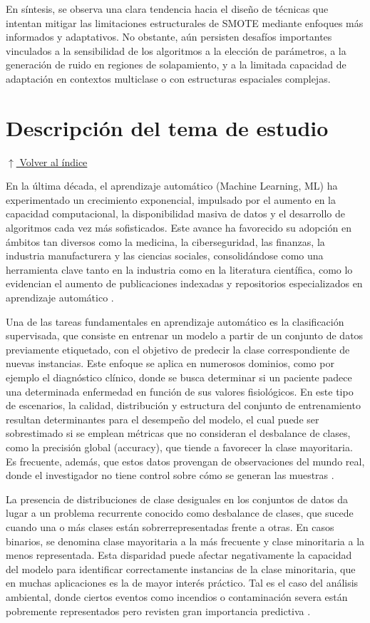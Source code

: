 \documentclass[12pt,a4paper]{article}
\begin{document}
En síntesis, se observa una clara tendencia hacia el diseño de técnicas que intentan mitigar las limitaciones estructurales de SMOTE mediante enfoques más informados y adaptativos. No obstante, aún persisten desafíos importantes vinculados a la sensibilidad de los algoritmos a la elección de parámetros, a la generación de ruido en regiones de solapamiento, y a la limitada capacidad de adaptación en contextos multiclase o con estructuras espaciales complejas.


\section{Descripción del tema de estudio} 
\noindent\hyperlink{toc}{\small$\uparrow$ Volver al índice}

En la última década, el aprendizaje automático (Machine Learning, ML) ha experimentado un crecimiento exponencial, impulsado por el aumento en la capacidad computacional, la disponibilidad masiva de datos y el desarrollo de algoritmos cada vez más sofisticados. Este avance ha favorecido su adopción en ámbitos tan diversos como la medicina, la ciberseguridad, las finanzas, la industria manufacturera y las ciencias sociales, consolidándose como una herramienta clave tanto en la industria como en la literatura científica, como lo evidencian el aumento de publicaciones indexadas y repositorios especializados en aprendizaje automático \parencite{khorshidi2025synthetic, nasaruddin2025smote}.

Una de las tareas fundamentales en aprendizaje automático es la clasificación supervisada, que consiste en entrenar un modelo a partir de un conjunto de datos previamente etiquetado, con el objetivo de predecir la clase correspondiente de nuevas instancias. Este enfoque se aplica en numerosos dominios, como por ejemplo el diagnóstico clínico, donde se busca determinar si un paciente padece una determinada enfermedad en función de sus valores fisiológicos. En este tipo de escenarios, la calidad, distribución y estructura del conjunto de entrenamiento resultan determinantes para el desempeño del modelo, el cual puede ser sobrestimado si se emplean métricas que no consideran el desbalance de clases, como la precisión global (accuracy), que tiende a favorecer la clase mayoritaria. Es frecuente, además, que estos datos provengan de observaciones del mundo real, donde el investigador no tiene control sobre cómo se generan las muestras \parencite{qiu2025vs}.

La presencia de distribuciones de clase desiguales en los conjuntos de datos da lugar a un problema recurrente conocido como desbalance de clases, que sucede cuando una o más clases están sobrerrepresentadas frente a otras. En casos binarios, se denomina clase mayoritaria a la más frecuente y clase minoritaria a la menos representada. Esta disparidad puede afectar negativamente la capacidad del modelo para identificar correctamente instancias de la clase minoritaria, que en muchas aplicaciones es la de mayor interés práctico. Tal es el caso del análisis ambiental, donde ciertos eventos como incendios o contaminación severa están pobremente representados pero revisten gran importancia predictiva \parencite{qiu2025vs}.
\end{document}
